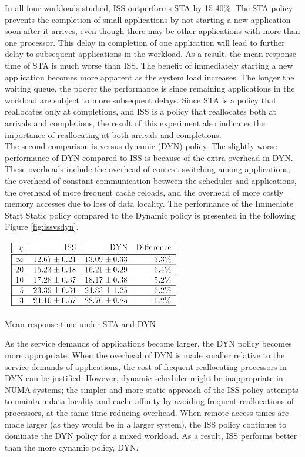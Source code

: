 \documentclass[a4paper,10pt]{article}
\makeatletter
\newenvironment{figurehere}{\def\@captype{figure}\vspace{2ex}}{\vspace{2ex}}
\makeatother
\begin{document}
\begin{multicols}{2}
In all four workloads studied, ISS outperforms STA by  15-40\%. The STA policy prevents the completion of small applications by not starting a new application soon after it arrives, even though there may be other applications with more than one processor. This delay in completion of one application will lead to further delay to subsequent applications in the workload. As a result, the mean response time of STA is much worse than ISS. The benefit of immediately starting a new application becomes more apparent as the system load increases. The longer the waiting queue, the poorer the performance is since remaining applications in the workload are subject to more subsequent delays. Since STA is a policy that reallocates only at completions, and ISS is a policy that reallocates both at arrivals and completions, the result of this experiment also indicates the importance of reallocating at both arrivals and completions.\\

The second comparison is versus dynamic (DYN) policy. The slightly worse performance of DYN compared to ISS is because of the extra overhead in DYN. These overheads include the overhead of context switching among applications, the overhead of constant communication between the scheduler and applications, the overhead of more frequent cache reloads, and the overhead of more costly memory accesses due to loss of data locality. The performance of the Immediate Start Static policy compared to the Dynamic policy is presented in the following Figure \ref{fig:issvsdyn}.

\begin{figurehere}
 \centering
 \includegraphics[width=8cm, height=3cm]{./eps/issvsdyn.png}
 \caption{Mean response time under STA and DYN}
 \label{fig:issvsdyn}
\end{figurehere}

As the service demands of applications become larger, the DYN policy becomes more appropriate. When the overhead of DYN is made smaller relative to the service demands of applications, the cost of frequent reallocating processors in DYN can be justified. However, dynamic scheduler might be inappropriate in NUMA systems; the simpler and more static approach of the ISS policy attempts to maintain data locality and cache affinity by avoiding frequent reallocations of processors, at the same time reducing overhead. When remote access times are made larger (as they would be in a larger system), the ISS policy continues to dominate the DYN policy for a mixed workload. As a result, ISS performs better than the more dynamic policy, DYN.


\end{multicols}
\end{document}
